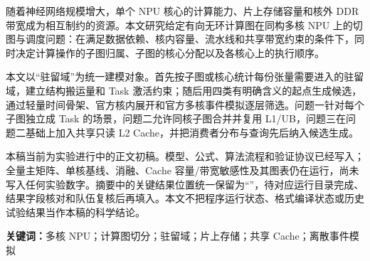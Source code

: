 随着神经网络规模增大，单个 NPU 核心的计算能力、片上存储容量和核外 DDR 带宽成为相互制约的资源。本文研究给定有向无环计算图在同构多核 NPU 上的切图与调度问题：在满足数据依赖、核内容量、流水线和共享带宽约束的条件下，同时决定计算操作的子图归属、子图的核心分配以及各核心上的执行顺序。

本文以“驻留域”为统一建模对象。首先按子图或核心统计每份张量需要进入的驻留域，建立结构搬运量和 Task 激活约束；随后用四类有明确含义的起点生成候选，通过轻量时间骨架、官方核内展开和官方多核事件模拟逐层筛选。问题一针对每个子图独立成 Task 的场景，问题二允许同核子图合并并复用 L1/UB，问题三在问题二基础上加入共享只读 L2 Cache，并把消费者分布与查询先后纳入候选生成。

本稿当前为实验进行中的正文初稿。模型、公式、算法流程和验证协议已经写入；全量主矩阵、单核基线、消融、Cache 容量/带宽敏感性及其图表仍在运行，尚未写入任何实验数字。摘要中的关键结果位置统一保留为“\pending”，待对应运行目录完成、结果字段核对和队伍复核后再填入。本文不把程序运行状态、格式编译状态或历史试验结果当作本稿的科学结论。

\noindent\textbf{关键词：}多核 NPU；计算图切分；驻留域；片上存储；共享 Cache；离散事件模拟

